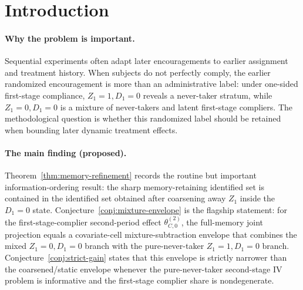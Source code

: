 \documentclass[11pt]{article}
\theoremstyle{definition}
\theoremstyle{plain}
\theoremstyle{remark}
\begin{document}
\begin{abstract}
Covariate-adaptive and sequentially randomized experiments with imperfect compliance are usually analyzed either as static IV bounds within baseline strata or as dynamic point-identification problems under strong cross-period conditions.  This proposal asks whether a previous randomized encouragement can tighten partial-identification bounds after it has ceased to be a treatment-relevant state variable.  The kernel conjecture is that, in a two-stage binary design, retaining \(Z_1\) inside the \(D_1=0\) branch yields a strict mixture-splitting gain for the second-period effect among first-stage compliers.  The gain comes from a compliance-revealing pure never-taker cell, not from adding another baseline covariate or from a Bellman recursion.  If resolved, the result would give a small, auditable partial-identification theorem explaining when adaptive assignment memory has identifying content under imperfect compliance.
\end{abstract}

\section{Introduction}
\paragraph{Why the problem is important.}
Sequential experiments often adapt later encouragements to earlier assignment and treatment history.  When subjects do not perfectly comply, the earlier randomized encouragement is more than an administrative label: under one-sided first-stage compliance, \(Z_1=1,D_1=0\) reveals a never-taker stratum, while \(Z_1=0,D_1=0\) is a mixture of never-takers and latent first-stage compliers.  The methodological question is whether this randomized label should be retained when bounding later dynamic treatment effects.

\paragraph{The main finding (proposed).}
Theorem~\ref{thm:memory-refinement} records the routine but important information-ordering result: the sharp memory-retaining identified set is contained in the identified set obtained after coarsening away \(Z_1\) inside the \(D_1=0\) state.  Conjecture~\ref{conj:mixture-envelope} is the flagship statement: for the first-stage-complier second-period effect \(\theta_{C,0}^{(2)}\), the full-memory joint projection equals a covariate-cell mixture-subtraction envelope that combines the mixed \(Z_1=0,D_1=0\) branch with the pure-never-taker \(Z_1=1,D_1=0\) branch.  Conjecture~\ref{conj:strict-gain} states that this envelope is strictly narrower than the coarsened/static envelope whenever the pure-never-taker second-stage IV problem is informative and the first-stage complier share is nondegenerate.
\end{document}
